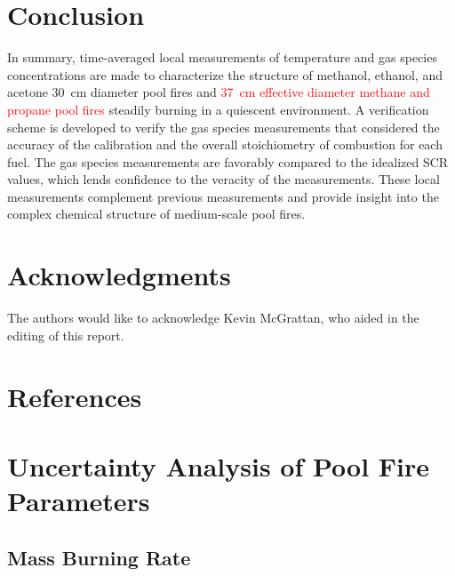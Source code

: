 \documentclass[12pt]{article}
\begin{document}
\section{Conclusion}
\label{sec:Conclusion}
In summary, time-averaged local measurements of temperature and gas species concentrations are made to characterize the structure of methanol, ethanol, and acetone 30~cm diameter pool fires and \textcolor{red}{37~cm effective diameter methane and propane pool fires} steadily burning in a quiescent environment. A verification scheme is developed to verify the gas species measurements that considered  the accuracy of the calibration and the overall stoichiometry of combustion for each fuel. The gas species measurements are favorably compared to the idealized SCR values, which lends confidence to the veracity of the measurements. These local measurements complement previous measurements and provide insight into the complex chemical structure of medium-scale pool fires.

\section*{Acknowledgments}
The authors would like to acknowledge Kevin McGrattan, who aided in the editing of this report.

\clearpage

\section*{References}




\clearpage


\appendix
{}
\makeatletter
\newcommand{\section@cntformat}{Appendix:\ }
\makeatother

\section{Uncertainty Analysis of Pool Fire Parameters}\label{sec:Uncertainty_Pool_Fire_Parameters}

\subsection{Mass Burning Rate}
\label{ssec:Mass_Burning_Flux}
\end{document}
